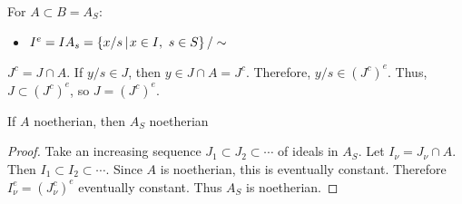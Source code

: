 \documentclass [letterpaper,11pt,twoside]{article}
\begin{document}
    For $A \subset B = A_S$:
    \begin{itemize}
      \item[] $I^e = IA_s = \mathset[x / s]{x\in I,\ s\in S} / \sim$
    \end{itemize}

    $J^c = J \cap A$.  If $y / s\in J$, then $y\in J \cap A = J^c$.  Therefore, $y / s\in (J^c)^e$.  Thus, $J \subset (J^c)^e$, so $J = (J^c)^e$.

    \begin{cor*}
      If $A$ noetherian, then $A_S$ noetherian
    \end{cor*}
    \begin{proof}
      Take an increasing sequence $J_1 \subset J_2 \subset \cdots$ of ideals in $A_S$.  Let $I_\nu = J_\nu \cap A$.  Then $I_1 \subset I_2 \subset \cdots$.  Since $A$ is noetherian, this is eventually constant.  Therefore $I_\nu^e = (J_\nu^c)^e$ eventually constant.  Thus $A_S$ is noetherian.
    \end{proof}
\end{document}
